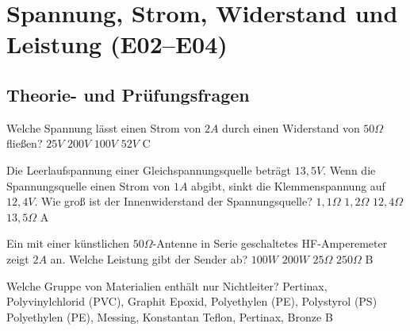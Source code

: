 \graphicspath{{e02-04_ET-Grundlagen/}}

\section{Spannung, Strom, Widerstand und Leistung (E02--E04)}



\subsection{Theorie- und Prüfungsfragen}



{Welche Spannung lässt einen Strom von $2A$ durch einen Widerstand von
$50\Omega$ fließen?}%
{$25V$}%
{$200V$}%
{$100V$}%
{$52V$}%
{C}%

{Die Leerlaufspannung einer Gleichspannungsquelle beträgt $13,5V$. Wenn die
Spannungsquelle einen Strom von $1A$ abgibt, sinkt die Klemmenspannung auf
$12,4V$. Wie groß ist der Innenwiderstand der Spannungsquelle?}%
{$1,1\Omega$}%
{$1,2\Omega$}%
{$12,4\Omega$}%
{$13,5\Omega$}%
{A}%

{Ein mit einer künstlichen $50\Omega$-Antenne in Serie geschaltetes
HF-Amperemeter zeigt $2A$ an. Welche Leistung gibt der Sender ab?}%
{$100W$}%
{$200W$}%
{$25\Omega$}%
{$250\Omega$}%
{B}%

{Welche Gruppe von Materialien enthält nur Nichtleiter?}%
{Pertinax, Polyvinylchlorid (PVC), Graphit}%
{Epoxid, Polyethylen (PE), Polystyrol (PS)}%
{Polyethylen (PE), Messing, Konstantan}%
{Teflon, Pertinax, Bronze}%
{B}%

